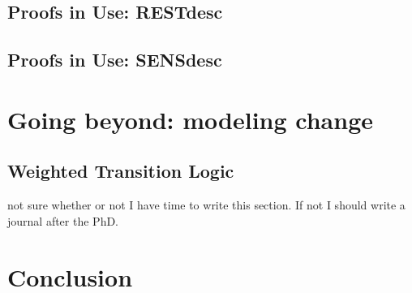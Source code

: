 \documentclass[11pt,a4paper,twoside]{book}
\newcommand\blankpage{%
    \null
    \thispagestyle{empty}%
    \addtocounter{page}{-1}%
    \newpage}
\begin{document}
\section{Proofs in Use: RESTdesc}\label{restdesc}
\section{Proofs in Use: SENSdesc}\label{sensdesc}



\chapter{Going beyond: modeling change}
\section{Weighted Transition Logic}
not sure whether or not I have time to write this section. If not I should write a journal after the PhD.


\chapter{Conclusion}\label{concl}\label{conclusion}



% 
% 
%     



\begin{appendices}
%    

\end{appendices}


\backmatter

    
\end{document}
